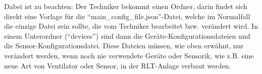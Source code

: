 Dabei ist zu beachten:
Der Techniker bekommt einen Ordner, darin findet sich direkt eine Vorlage für die \enquote{main\_config\_file.json}-Datei, welche im Normalfall die einzige Datei sein sollte, die vom Techniker bearbeitet bzw. verändert wird.
In einem Unterordner (\enquote{devices}) sind dann die Geräte-Konfigurationsdateien und die Sensor-Konfigurationsdatei. Diese Dateien müssen, wie oben erwähnt, nur verändert werden, wenn noch nie verwendete Geräte oder Sensorik, wie z.B. eine neue Art von Ventilator oder Sensor, in der RLT-Anlage verbaut werden.





